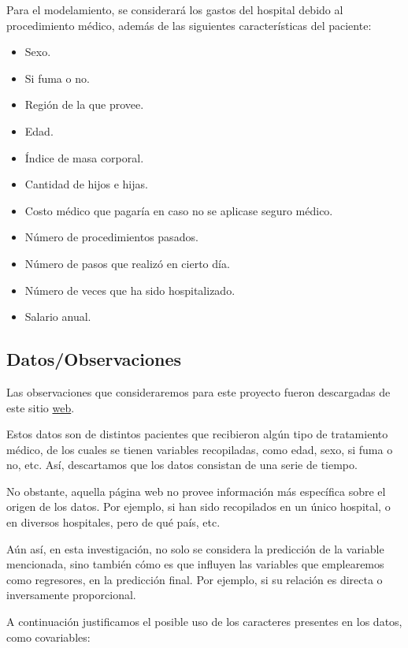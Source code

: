 \documentclass[
  letterpaper,
  DIV=11,
  numbers=noendperiod]{scrartcl}
\providecommand{\tightlist}{%
  \setlength{\itemsep}{0pt}\setlength{\parskip}{0pt}}\usepackage{longtable,booktabs,array}
\begin{document}
Para el modelamiento, se considerará los gastos del hospital debido al
procedimiento médico, además de las siguientes características del
paciente:

\begin{itemize}
\tightlist
\item
  Sexo.
\item
  Si fuma o no.
\item
  Región de la que provee.
\item
  Edad.
\item
  Índice de masa corporal.
\item
  Cantidad de hijos e hijas.
\item
  Costo médico que pagaría en caso no se aplicase seguro médico.
\item
  Número de procedimientos pasados.
\item
  Número de pasos que realizó en cierto día.
\item
  Número de veces que ha sido hospitalizado.
\item
  Salario anual.
\end{itemize}

\subsection{Datos/Observaciones}\label{datosobservaciones}

Las observaciones que consideraremos para este proyecto fueron
descargadas de este sitio
\href{https://www.kaggle.com/datasets/shubhamsingh57/ml-model-practice-linear-regression/data}{web}.

Estos datos son de distintos pacientes que recibieron algún tipo de
tratamiento médico, de los cuales se tienen variables recopiladas, como
edad, sexo, si fuma o no, etc. Así, descartamos que los datos consistan
de una serie de tiempo.

No obstante, aquella página web no provee información más específica
sobre el origen de los datos. Por ejemplo, si han sido recopilados en un
único hospital, o en diversos hospitales, pero de qué país, etc.

Aún así, en esta investigación, no solo se considera la predicción de la
variable mencionada, sino también cómo es que influyen las variables que
emplearemos como regresores, en la predicción final. Por ejemplo, si su
relación es directa o inversamente proporcional.

A continuación justificamos el posible uso de los caracteres presentes
en los datos, como covariables:
\end{document}

